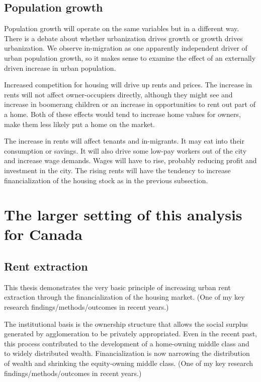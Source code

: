 \subsection{Population growth}
Population growth will operate on the same variables  but in a different way. There is a debate about whether urbanization drives  growth or growth drives urbanization. We observe in-migration as one apparently independent driver of urban population growth,  so it makes sense to examine the effect of an externally driven increase in urban population. 

Increased competition for housing will drive up rents and prices. The increase in rents will not affect owner-occupiers directly, although they might see and increase in boomerang children or an increase in opportunities to rent out part of a home. Both of these effects would tend to increase home values for owners, make them less likely put a home on the market. 

The increase in rents will affect tenants and in-migrants. It may eat into their consumption or savings. It will also drive some low-pay workers out of the city and increase wage demands. Wages will have to rise, probably reducing profit and investment in the city. The rising rents will have the tendency to increase financialization of the housing stock as in the previous subsection.


\section{The larger setting of this analysis for Canada}

\subsection{Rent extraction}

This thesis demonstrates the very basic principle of increasing urban rent extraction through the financialization of the housing market. 
{\color{red}(One of my key research findings/methods/outcomes in recent years.)}
 
The institutional basis is the ownership structure that allows the social surplus generated by agglomeration to be privately appropriated. Even in the recent past, this process contributed to the development of a home-owning middle class and to widely distributed wealth. Financialization is now narrowing the distribution of wealth and shrinking the equity-owning middle class. {\color{red}(One of my key research findings/methods/outcomes in recent years.)}

